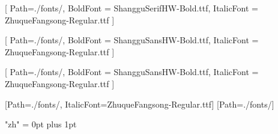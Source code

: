 \usepackage{fontspec}
\usepackage{xeCJK}
\providecommand{\ScriptsDebugFontRoot}{./fonts/}

[
  Path=\ScriptsDebugFontRoot,
  BoldFont   = {ShangguSerifHW-Bold.ttf},
  ItalicFont = {ZhuqueFangsong-Regular.ttf}
]

[
  Path=\ScriptsDebugFontRoot,
  BoldFont   = {ShangguSansHW-Bold.ttf},
  ItalicFont = {ZhuqueFangsong-Regular.ttf}
]

\newCJKfontfamily{}[
  Path=\ScriptsDebugFontRoot,
  BoldFont   = {ShangguSansHW-Bold.ttf},
  ItalicFont = {ZhuqueFangsong-Regular.ttf}
]

\newCJKfontfamily{}[Path=\ScriptsDebugFontRoot, ItalicFont={ZhuqueFangsong-Regular.ttf}]
\newCJKfontfamily{}[Path=\ScriptsDebugFontRoot]

\XeTeXlinebreaklocale "zh"
\XeTeXlinebreakskip = 0pt plus 1pt
